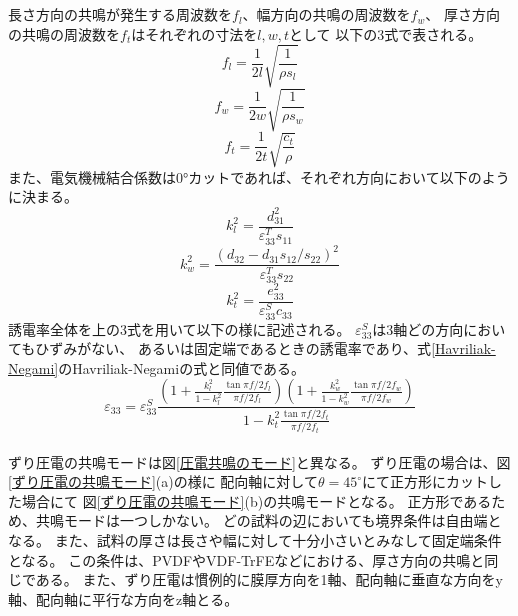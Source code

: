 \documentclass[dvipdfmx,12pt,a4paper]{jreport}
\begin{document}
			\\ \\
			長さ方向の共鳴が発生する周波数を$f_l$、幅方向の共鳴の周波数を$f_w$、
			厚さ方向の共鳴の周波数を$f_t$はそれぞれの寸法を$l, w, t$として
			以下の3式で表される。
			\begin{equation}
				f_l = \frac{1}{2l}\sqrt{\frac{1}{\rho s_l}}
			\end{equation} 
			\begin{equation}
				f_w = \frac{1}{2w}\sqrt{\frac{1}{\rho s_w}}
			\end{equation}
			\begin{equation}
				f_t = \frac{1}{2t}\sqrt{\frac{c_t}{\rho}}
			\end{equation} 
			また、電気機械結合係数は0°カットであれば、それぞれ方向において以下のように決まる。
			\begin{equation}
				k_l^2 = \frac{d_{31}^2}{\varepsilon_{33}^T s_{11}}
			\end{equation}
			\begin{equation}
				k_w^2 = \frac{\left(d_{32} - d_{31}s_{12}/s_{22} \right)^2}
				{\varepsilon_{33}^T s_{22}}
			\end{equation}
			\begin{equation}
				k_t^2 = \frac{e_{33}^2}{\varepsilon_{33}^S c_{33}}
			\end{equation}
			誘電率全体を上の3式を用いて以下の様に記述される。
			$\varepsilon_{33}^S$は3軸どの方向においてもひずみがない、
			あるいは固定端であるときの誘電率であり、式\eqref{Havriliak-Negami}のHavriliak-Negamiの式と同値である。
			\begin{equation}
				\varepsilon_{33} =
				\varepsilon_{33}^S
				\frac{\left(1+\frac{k_l^2}{1-k_l^2}\frac{\tan{\pi f/2f_l}}{\pi f/2f_l}\right)
				\left( 
					1+\frac{k_w^2}{1-k_w^2}\frac{\tan{\pi f/2f_w}}{\pi f/2f_w}
				\right)
				}
				{1-k_t^2\frac{\tan{\pi f/2f_t}}{\pi f/2f_t}}
				\label{normal_piezo_resonance}
			\end{equation}
			\\
			ずり圧電の共鳴モードは図\ref{圧電共鳴のモード}と異なる。
			ずり圧電の場合は、図\ref{ずり圧電の共鳴モード}(a)の様に
			配向軸に対して$\theta=45^\circ$にて正方形にカットした場合にて
			図\ref{ずり圧電の共鳴モード}(b)の共鳴モードとなる。
			正方形であるため、共鳴モードは一つしかない。
			どの試料の辺においても境界条件は自由端となる。
			また、試料の厚さは長さや幅に対して十分小さいとみなして固定端条件となる。
			この条件は、PVDFやVDF-TrFEなどにおける、厚さ方向の共鳴と同じである。
			また、ずり圧電は慣例的に膜厚方向を1軸、配向軸に垂直な方向をy軸、配向軸に平行な方向をz軸とる。
\end{document}
